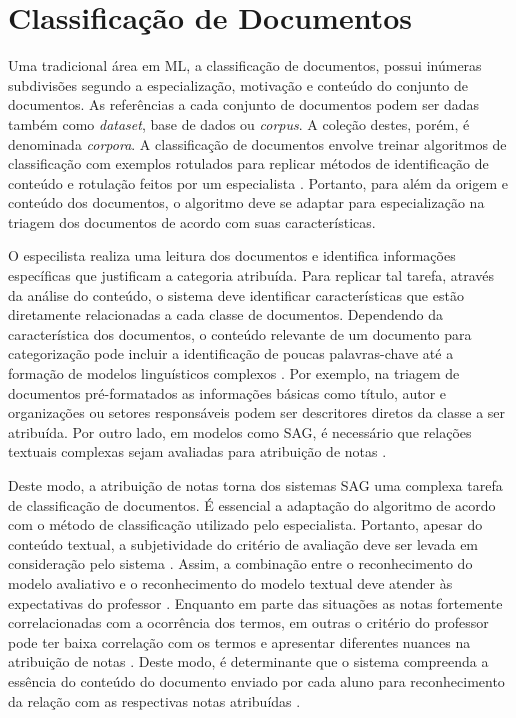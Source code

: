 \section{Classificação de Documentos}

Uma tradicional área em ML, a classificação de documentos, possui inúmeras subdivisões segundo a especialização, motivação e conteúdo do conjunto de documentos. As referências a cada conjunto de documentos podem ser dadas também como \textit{dataset}, base de dados ou \textit{corpus}. A coleção destes, porém, é denominada \textit{corpora}. A classificação de documentos envolve treinar algoritmos de classificação com exemplos rotulados para replicar métodos de identificação de conteúdo e rotulação feitos por um especialista \cite{baeza2011}. Portanto, para além da origem e conteúdo dos documentos, o algoritmo deve se adaptar para especialização na triagem dos documentos de acordo com suas características.

O especilista realiza uma leitura dos documentos e identifica informações específicas que justificam a categoria atribuída. Para replicar tal tarefa, através da análise do conteúdo, o sistema deve identificar características que estão diretamente relacionadas a cada classe de documentos. Dependendo da característica dos documentos, o conteúdo relevante de um documento para categorização pode incluir a identificação de poucas palavras-chave até a formação de modelos linguísticos complexos \cite{jurafsky2009}. Por exemplo, na triagem de documentos pré-formatados as informações básicas como título, autor e organizações ou setores responsáveis podem ser descritores diretos da classe a ser atribuída. Por outro lado, em modelos como SAG, é necessário que relações textuais complexas sejam avaliadas para atribuição de notas \cite{paiva2012, yang2021}.

Deste modo, a atribuição de notas torna dos sistemas SAG uma complexa tarefa de classificação de documentos. É essencial a adaptação do algoritmo de acordo com o método de classificação utilizado pelo especialista. Portanto, apesar do conteúdo textual, a subjetividade do critério de avaliação deve ser levada em consideração pelo sistema \cite{pado2021}. Assim, a combinação entre o reconhecimento do modelo avaliativo e o reconhecimento do modelo textual deve atender às expectativas do professor \cite{condor2020}. Enquanto em parte das situações as notas fortemente correlacionadas com a ocorrência dos termos, em outras o critério do professor pode ter baixa correlação com os termos e apresentar diferentes nuances na atribuição de notas \cite{azad2020}. Deste modo, é determinante que o sistema compreenda a essência do conteúdo do documento enviado por cada aluno para reconhecimento da relação com as respectivas notas atribuídas \cite{mohler2011}.

